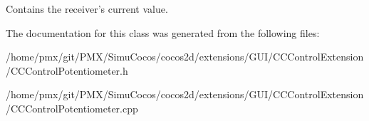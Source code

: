 Contains the receiver’s current value. 

The documentation for this class was generated from the following files\+:\begin{DoxyCompactItemize}
\item 
/home/pmx/git/\+P\+M\+X/\+Simu\+Cocos/cocos2d/extensions/\+G\+U\+I/\+C\+C\+Control\+Extension/C\+C\+Control\+Potentiometer.\+h\item 
/home/pmx/git/\+P\+M\+X/\+Simu\+Cocos/cocos2d/extensions/\+G\+U\+I/\+C\+C\+Control\+Extension/C\+C\+Control\+Potentiometer.\+cpp\end{DoxyCompactItemize}
